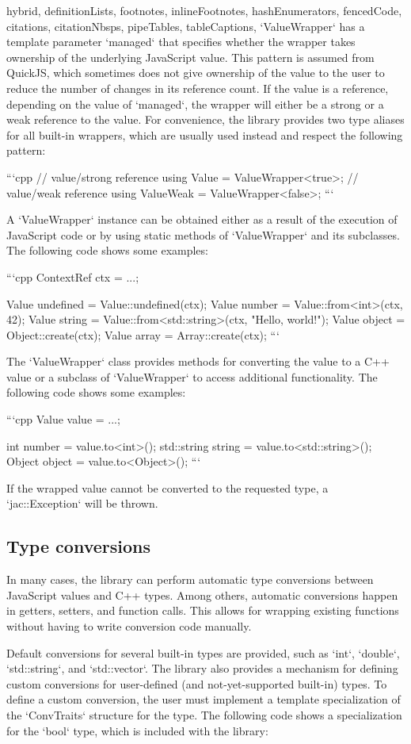 \begin{markdown*}{%
  hybrid,
  definitionLists,
  footnotes,
  inlineFootnotes,
  hashEnumerators,
  fencedCode,
  citations,
  citationNbsps,
  pipeTables,
  tableCaptions,
}
`ValueWrapper` has a template parameter `managed` that specifies whether the wrapper takes ownership of the underlying JavaScript value. This pattern is assumed from QuickJS, which sometimes does not give ownership of the value to the user to reduce the number of changes in its reference count. If the value is a reference, depending on the value of `managed`, the wrapper will either be a strong or a weak reference to the value. For convenience, the library provides two type aliases for all built-in wrappers, which are usually used instead and respect the following pattern:

```cpp
// value/strong reference
using Value = ValueWrapper<true>;
// value/weak reference
using ValueWeak = ValueWrapper<false>;
```

A `ValueWrapper` instance can be obtained either as a result of the execution of JavaScript code or by using static methods of `ValueWrapper` and its subclasses. The following code shows some examples:

```cpp
ContextRef ctx = ...;

Value undefined = Value::undefined(ctx);
Value number = Value::from<int>(ctx, 42);
Value string = Value::from<std::string>(ctx, "Hello, world!");
Value object = Object::create(ctx);
Value array = Array::create(ctx);
```

The `ValueWrapper` class provides methods for converting the value to a C++ value or a subclass of `ValueWrapper` to access additional functionality. The following code shows some examples:

```cpp
Value value = ...;

int number = value.to<int>();
std::string string = value.to<std::string>();
Object object = value.to<Object>();
```

If the wrapped value cannot be converted to the requested type, a `jac::Exception` will be thrown.

\subsection{Type conversions}

In many cases, the library can perform automatic type conversions between JavaScript values and C++ types. Among others, automatic conversions happen in getters, setters, and function calls. This allows for wrapping existing functions without having to write conversion code manually.

Default conversions for several built-in types are provided, such as `int`, `double`, `std::string`, and `std::vector`. The library also provides a mechanism for defining custom conversions for user-defined (and not-yet-supported built-in) types. To define a custom conversion, the user must implement a template specialization of the `ConvTraits` structure for the type. The following code shows a specialization for the `bool` type, which is included with the library:


\end{markdown*}
